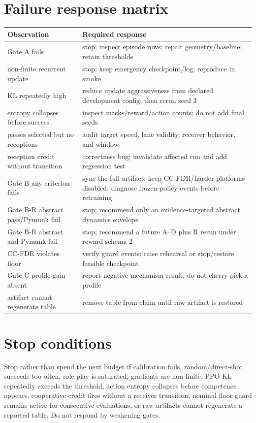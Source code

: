 \documentclass[12pt,twocolumn]{article}
\begin{document}
\section{Failure response matrix}
\begin{center}
\small
\begin{tabular}{p{}p{}}
\toprule Observation & Required response \\
\midrule
Gate A fails & stop; inspect episode rows; repair geometry/baseline; retain thresholds \\
non-finite recurrent update & stop; keep emergency checkpoint/log; reproduce in smoke \\
KL repeatedly high & reduce update aggressiveness from declared development config, then rerun seed 3 \\
entropy collapses before success & inspect masks/reward/action counts; do not add final seeds \\
passes selected but no receptions & audit target speed, lane validity, receiver behavior, and window \\
reception credit without transition & correctness bug; invalidate affected run and add regression test \\
Gate B any criterion fails & sync the full artifact; keep CC-FDR/harder platforms disabled;
diagnose frozen-policy events before retraining \\
Gate B-R abstract pass/Pymunk fail & stop; recommend only an evidence-targeted abstract dynamics
envelope \\
Gate B-R abstract and Pymunk fail & stop; recommend a future A--D plus R rerun under reward schema
2 \\
CC-FDR violates floor & verify guard events; raise rehearsal or stop/restore feasible checkpoint \\
Gate C profile gain absent & report negative mechanism result; do not cherry-pick a profile \\
artifact cannot regenerate table & remove table from claim until raw artifact is restored \\
\bottomrule
\end{tabular}
\normalsize
\end{center}

\section{Stop conditions}
Stop rather than spend the next budget if calibration fails, random/direct-shot succeeds too often,
role play is saturated, gradients are non-finite, PPO KL repeatedly exceeds the threshold, action
entropy collapses before competence appears, cooperative credit fires without a receiver
transition, nominal floor guard remains active for consecutive evaluations, or raw artifacts
cannot regenerate a reported table. Do not respond by weakening gates.
\end{document}
